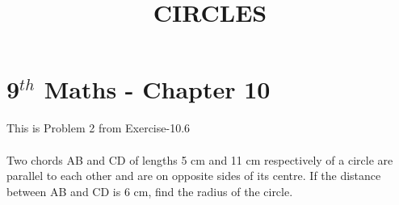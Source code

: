 \documentclass[10pt]{article}
\begin{document}
\begin{center}
\title{\textbf{CIRCLES}}
\date{\vspace{-5ex}} %
\maketitle
\end{center}
\section{9$^{th}$ Maths - Chapter 10}

This is Problem 2 from Exercise-10.6\\\\
Two chords AB and CD of lengths 5 cm and 11 cm respectively of a circle are parallel
to each other and are on opposite sides of its centre. If the distance between AB and
CD is 6 cm, find the radius of the circle.
\end{document}
